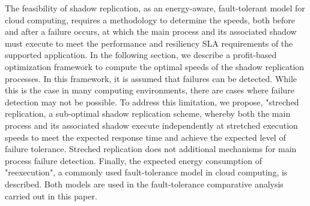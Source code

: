 The feasibility of shadow replication, as an energy-aware, fault-tolerant model for cloud computing, requires
a methodology to determine the speeds, both before and after a failure occurs, 
at which the main process and its associated shadow must execute to meet the performance 
and resiliency SLA requirements of the supported application.  
In the following section, we describe a profit-based optimization framework to compute the optimal
speeds of the shadow replication processes. In this framework, it is assumed that
failures can be detected.  While this is the case in many computing
environments, there are cases where failure detection may not be
possible. To address this limitation, we propose, "streched replication, a sub-optimal shadow
replication scheme, whereby both the main process and its associated shadow
execute independently at stretched execution speeds to meet the expected
response time and achieve the expected level of failure tolerance. Streched replication does not additional mechanisms for main process failure
detection. Finally, the expected energy consumption of "reexecution", a commonly used fault-tolerance model
in cloud computing, is described. Both models are used in the fault-tolerance comparative analysis carried out in this paper.
 
